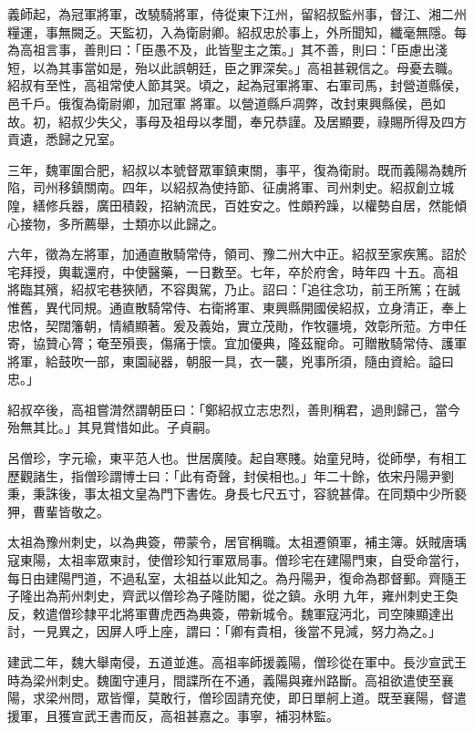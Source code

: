 \begin{pinyinscope}
 義師起，為冠軍將軍，改驍騎將軍，侍從東下江州，留紹叔監州事，督江、湘二州糧運，事無闕乏。天監初，入為衛尉卿。紹叔忠於事上，外所聞知，纖毫無隱。每為高祖言事，善則曰：「臣愚不及，此皆聖主之策。」其不善，則曰：「臣慮出淺短，以為其事當如是，殆以此誤朝廷，臣之罪深矣。」高祖甚親信之。母憂去職。紹叔有至性，高祖常使人節其哭。頃之，起為冠軍將軍、右軍司馬，封營道縣侯，邑千戶。俄復為衛尉卿，加冠軍
 將軍。以營道縣戶凋弊，改封東興縣侯，邑如故。初，紹叔少失父，事母及祖母以孝聞，奉兄恭謹。及居顯要，祿賜所得及四方貢遺，悉歸之兄室。



 三年，魏軍圍合肥，紹叔以本號督眾軍鎮東關，事平，復為衛尉。既而義陽為魏所陷，司州移鎮關南。四年，以紹叔為使持節、征虜將軍、司州刺史。紹叔創立城隍，繕修兵器，廣田積穀，招納流民，百姓安之。性頗矜躁，以權勢自居，然能傾心接物，多所薦舉，士類亦以此歸之。



 六年，徵為左將軍，加通直散騎常侍，領司、豫二州大中正。紹叔至家疾篤。詔於宅拜授，輿載還府，中使醫藥，一日數至。七年，卒於府舍，時年四
 十五。高祖將臨其殯，紹叔宅巷狹陋，不容輿駕，乃止。詔曰：「追往念功，前王所篤；在誠惟舊，異代同規。通直散騎常侍、右衛將軍、東興縣開國侯紹叔，立身清正，奉上忠恪，契闊籓朝，情績顯著。爰及義始，實立茂勛，作牧疆境，效彰所蒞。方申任寄，協贊心膂；奄至殞喪，傷痛于懷。宜加優典，隆茲寵命。可贈散騎常侍、護軍將軍，給鼓吹一部，東園祕器，朝服一具，衣一襲，兇事所須，隨由資給。謚曰忠。」



 紹叔卒後，高祖嘗潸然謂朝臣曰：「鄭紹叔立志忠烈，善則稱君，過則歸己，當今殆無其比。」其見賞惜如此。子貞嗣。



 呂僧珍，字元瑜，東平范人也。世居廣陵。起自寒賤。始童兒時，從師學，有相工歷觀諸生，指僧珍謂博士曰：「此有奇聲，封侯相也。」年二十餘，依宋丹陽尹劉秉，秉誅後，事太祖文皇為門下書佐。身長七尺五寸，容貌甚偉。在同類中少所褻狎，曹輩皆敬之。



 太祖為豫州刺史，以為典簽，帶蒙令，居官稱職。太祖遷領軍，補主簿。妖賊唐瑀寇東陽，太祖率眾東討，使僧珍知行軍眾局事。僧珍宅在建陽門東，自受命當行，每日由建陽門道，不過私室，太祖益以此知之。為丹陽尹，復命為郡督郵。齊隨王子隆出為荊州刺史，齊武以僧珍為子隆防閣，從之鎮。永明
 九年，雍州刺史王奐反，敕遣僧珍隸平北將軍曹虎西為典簽，帶新城令。魏軍寇沔北，司空陳顯達出討，一見異之，因屏人呼上座，謂曰：「卿有貴相，後當不見減，努力為之。」



 建武二年，魏大舉南侵，五道並進。高祖率師援義陽，僧珍從在軍中。長沙宣武王時為梁州刺史。魏圍守連月，間諜所在不通，義陽與雍州路斷。高祖欲遣使至襄陽，求梁州問，眾皆憚，莫敢行，僧珍固請充使，即日單舸上道。既至襄陽，督遣援軍，且獲宣武王書而反，高祖甚嘉之。事寧，補羽林監。




\end{pinyinscope}
